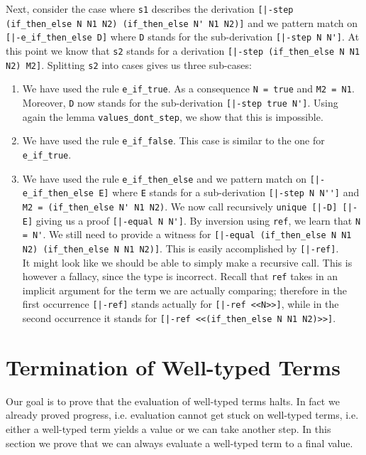 Next, consider the case where \lstinline!s1! describes the derivation
\lstinline![|-step (if_then_else N N1 N2) (if_then_else N' N1 N2)]! and we pattern match on
\lstinline![|-e_if_then_else D]! where \lstinline!D! stands for the sub-derivation
\lstinline![|-step N N']!. At this point we know that \lstinline!s2! stands
for a derivation \lstinline![|-step (if_then_else N N1 N2) M2]!. Splitting
\lstinline!s2! into cases gives us three sub-cases:

\begin{enumerate}
\item We have used the rule \lstinline!e_if_true!. As a consequence
  \lstinline!N = true! and \lstinline!M2 = N1!. Moreover,
  \lstinline!D! now stands for the sub-derivation \lstinline![|-step true N']!.
  Using again the lemma \lstinline!values_dont_step!, we show that this is impossible.
\item We have used the rule \lstinline!e_if_false!. This case is similar to
  the one for \lstinline!e_if_true!.
\item We have used the rule \lstinline!e_if_then_else! and we pattern match on
\lstinline![|-e_if_then_else E]! where \lstinline!E! stands for a sub-derivation
\lstinline![|-step N N'']! and \lstinline!M2 = (if_then_else N' N1 N2)!.
We now call recursively \lstinline!unique [|-D] [|-E]! giving us a proof
\lstinline![|-equal N N']!. By inversion using \lstinline!ref!, we learn that
\lstinline!N = N'!. We still need to provide a witness for
\lstinline![|-equal (if_then_else N N1 N2) (if_then_else N N1 N2)]!. This is easily
accomplished by \lstinline![|-ref]!. \\[0.5em]
It might look like we should be able to simply make a recursive call. This is
however a fallacy, since the type is incorrect. Recall that \lstinline!ref!
takes in an implicit argument for the term we are actually comparing; therefore
in the first occurrence \lstinline![|-ref]! stands actually for
\lstinline![|-ref <<N>>]!, while in the second occurrence it %
stands for \lstinline![|-ref <<(if_then_else N N1 N2)>>]!.
\end{enumerate}


\section{Termination of Well-typed Terms}
Our goal is to prove that the evaluation of well-typed terms halts. In
fact we already proved progress, i.e. evaluation cannot get stuck on
well-typed terms, i.e. either a well-typed term yields a value or we
can take another step. In this section we prove that we can always
evaluate a well-typed term to a final value.

